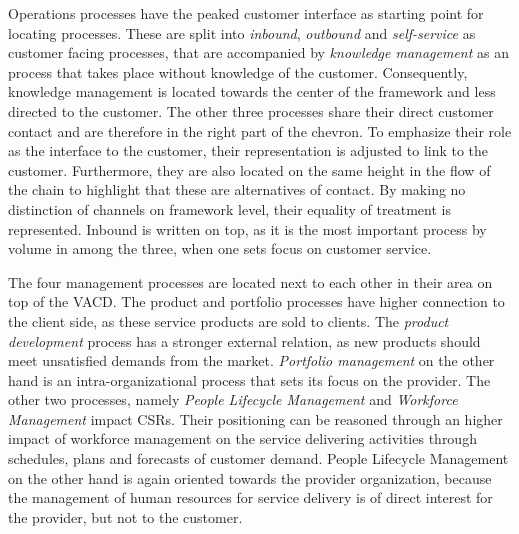 	 Operations processes have the peaked customer interface as starting point for locating processes. These are split into \textit{inbound}, \textit{outbound} and \textit{self-service} as customer facing processes, that are accompanied by\textit{ knowledge management} as an process that takes place without knowledge of the customer. Consequently, knowledge management is located towards the center of the framework and less directed to the customer. The other three processes share their direct customer contact and are therefore in the right part of the chevron. To emphasize their role as the interface to the customer, their representation is adjusted to link to the customer. Furthermore, they are also located on the same height in the flow of the chain to highlight that these are alternatives of contact. By making no distinction of channels on framework level, their equality of treatment is represented. Inbound is written on top, as it is the most important process by volume in among the three, when one sets focus on customer service.
	 
	 The four management processes are located next to each other in their area on top of the \acrshort{VACD}. The product and portfolio processes have higher connection to the client side, as these service products are sold to  clients. The \textit{product development} process has a stronger external relation, as new products should meet unsatisfied demands from the market. \textit{Portfolio management} on the other hand is an intra-organizational process that sets its focus on the provider. The other two processes, namely \textit{People Lifecycle Management} and \textit{Workforce Management} impact \acrshort{CSR}s. Their positioning can be reasoned through an higher impact of workforce management on the service delivering activities through schedules, plans and forecasts of customer demand. People Lifecycle Management on the other hand is again oriented towards the provider organization, because the management of human resources for service delivery is of direct interest for the provider, but not to the customer.
	 
